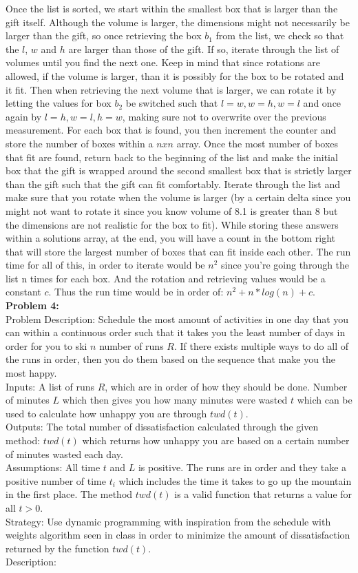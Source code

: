 \documentclass{article}
\begin{document}
Once the list is sorted, we start within the smallest box that is larger than the gift itself. Although the volume is larger, the dimensions might not necessarily be larger than the gift, so once retrieving the box $b_1$ from the list, we check so that the $l$, $w$ and $h$ are larger than those of the gift. If so, iterate through the list of volumes until you find the next one. Keep in mind that since rotations are allowed, if the volume is larger, than it is possibly for the box to be rotated and it fit. Then when retrieving the next volume that is larger, we can rotate it by letting the values for box $b_2$ be switched such that $l=w, w=h, w=l$ and once again by $l=h, w=l, h=w$, making sure not to overwrite over the previous measurement. For each box that is found, you then increment the counter and store the number of boxes within a $nxn$ array. Once the most number of boxes that fit are found, return back to the beginning of the list and make the initial box that the gift is wrapped around the second smallest box that is strictly larger than the gift such that the gift can fit comfortably. Iterate through the list and make sure that you rotate when the volume is larger (by a certain delta since you might not want to rotate it since you know volume of 8.1 is greater than 8 but the dimensions are not realistic for the box to fit). While storing these answers within a solutions array, at the end, you will have a count in the bottom right that will store the largest number of boxes that can fit inside each other. The run time for all of this, in order to iterate would be $n^2$ since you're going through the list n times for each box. And the rotation and retrieving values would be a constant $c$. Thus the run time would be in order of: $n^2 + n*log(n) + c$. \\
\textbf{Problem 4:}\\
Problem Description: Schedule the most amount of activities in one day that you can within a continuous order such that it takes you the least number of days in order for you to ski $n$ number of runs $R$. If there exists multiple ways to do all of the runs in order, then you do them based on the sequence that make you the most happy.  \\
Inputs: A list of runs $R$, which are in order of how they should be done. Number of minutes $L$ which then gives you how many minutes were wasted $t$ which can be used to calculate how unhappy you are through $twd(t)$.\\
Outputs: The total number of dissatisfaction calculated through the given method: $twd(t)$ which returns how unhappy you are based on a certain number of minutes wasted each day.\\
Assumptions: All time $t$ and $L$ is positive. The runs are in order and they take a positive number of time $t_i$ which includes the time it takes to go up the mountain in the first place. The method $twd(t)$ is a valid function that returns a value for all $t>0$.\\ 
Strategy: Use dynamic programming with inspiration from the schedule with weights algorithm seen in class in order to minimize the amount of dissatisfaction returned by the function $twd(t)$.\\
Description: \\
\end{document}
